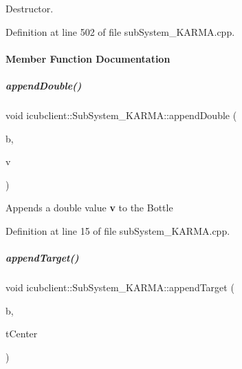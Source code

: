 Destructor. 



Definition at line 502 of file sub\+System\+\_\+\+K\+A\+R\+M\+A.\+cpp.



\paragraph{Member Function Documentation}
\mbox{\label{group__icubclient__subsystems_aa401a2dc18c491f11a1ba36ab6811606}} 
\subparagraph{\texorpdfstring{append\+Double()}{appendDouble()}}
{\footnotesize\ttfamily void icubclient\+::\+Sub\+System\+\_\+\+K\+A\+R\+M\+A\+::append\+Double (\begin{DoxyParamCaption}\item[{yarp\+::os\+::\+Bottle \&}]{b,  }\item[{const double \&}]{v }\end{DoxyParamCaption})\hspace{0.3cm}{\ttfamily [protected]}}



Appends a double value {\bfseries v} to the Bottle {\bfseries } 



Definition at line 15 of file sub\+System\+\_\+\+K\+A\+R\+M\+A.\+cpp.

\mbox{\label{group__icubclient__subsystems_a9dc49c4b5c168366758cd9ee23654a42}} 
\subparagraph{\texorpdfstring{append\+Target()}{appendTarget()}}
{\footnotesize\ttfamily void icubclient\+::\+Sub\+System\+\_\+\+K\+A\+R\+M\+A\+::append\+Target (\begin{DoxyParamCaption}\item[{yarp\+::os\+::\+Bottle \&}]{b,  }\item[{const yarp\+::sig\+::\+Vector\+Of$<$ double $>$ \&}]{t\+Center }\end{DoxyParamCaption})\hspace{0.3cm}{\ttfamily [protected]}}



